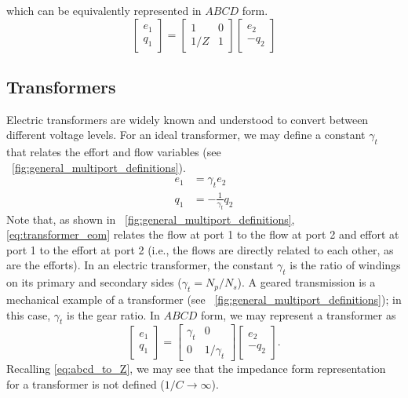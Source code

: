 \documentclass[5p,times]{elsarticle}
\begin{document}
%
which can be equivalently represented in $ABCD$ form.
%
\begin{equation}
        \begin{bmatrix}
                e_1 \\ q_1
        \end{bmatrix}
        =
        \begin{bmatrix}
                1 & 0 \\ 1/Z & 1
        \end{bmatrix}
        \begin{bmatrix}
                e_2 \\ - q_2
        \end{bmatrix}
        \label{eq:parallel_impedance_abcd}%
\end{equation}

\subsection{Transformers}\label{sec:trasnformers}
Electric transformers are widely known and understood to convert between different voltage levels.
For an ideal transformer, we may define a constant $\gamma_{t}$ that relates the effort and flow variables (see \figurename~\ref{fig:general_multiport_definitions}).
%
\begin{subequations}
        \begin{align}
               e_1 &= \gamma_{t} e_2 \\
               q_1 &= -\frac{1}{\gamma_t} q_2
        \end{align}
        \label{eq:transformer_eom}%
\end{subequations}
%
Note that, as shown in \figurename~\ref{fig:general_multiport_definitions}, \eqref{eq:transformer_eom} relates the flow at port 1 to the flow at port 2 and effort at port 1 to the effort at port 2 (i.e., the flows are directly related to each other, as are the efforts).
In an electric transformer, the constant $\gamma_t$ is the ratio of windings on its primary and secondary sides ($\gamma_t=N_p/N_s$).
A geared transmission is a mechanical example of a transformer (see \figurename~\ref{fig:general_multiport_definitions}); in this case, $\gamma_{t}$ is the gear ratio.
In $ABCD$ form, we may represent a transformer as
%
\begin{equation}
        \begin{bmatrix}
                e_1 \\ q_1
        \end{bmatrix}
        =
        \begin{bmatrix}
                \gamma_{t} & 0 \\ 0 & 1/\gamma_{t}
        \end{bmatrix}
        \begin{bmatrix}
                e_2 \\ - q_2
        \end{bmatrix} .
        \label{eq:transformer_abcd}
\end{equation}
%
Recalling \eqref{eq:abcd_to_Z}, we may see that the impedance form representation for a transformer is not defined ($1/C \rightarrow \infty$).
\end{document}
